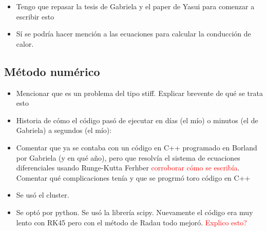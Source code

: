 \documentclass[aps,prb,twocolumn,superscriptaddress,floatfix,longbibliography,10pt]{revtex4-2}
\newcounter{para}
\begin{document}
\begin{itemize}
  \item Tengo que repasar la tesis de Gabriela y el paper de Yasui para comenzar a escribir esto
  \item Sí se podría hacer mención a las ecuaciones para calcular la conducción de calor.
\end{itemize}

\subsection{Método numérico}

\begin{itemize}
  \item Mencionar que es un problema del tipo stiff. Explicar brevente de qué se trata esto
  \item Historia de cómo el código pasó de ejecutar en días (el mío) o minutos (el de Gabriela) a segundos (el mío):
  \item Comentar que ya se contaba con un código en C++ programado en Borland por Gabriela (y en qué año), pero que resolvía el sistema de ecuaciones diferenciales usando Runge-Kutta Ferhber \textcolor{red}{corroborar cómo se escribía}. Comentar qué complicaciones tenía y que se progrmó toro código en C++
  \item Se usó el cluster.
  \item Se optó por python. Se usó la librería scipy. Nuevamente el código era muy lento con RK45 pero con el método de Radau todo mejoró. \textcolor{red}{Explico esto?}
\end{itemize}
\end{document}
